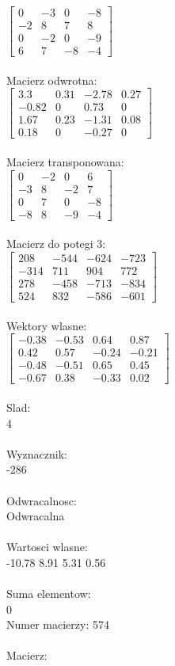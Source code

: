 \documentclass[a4paper,12pt]{article}
\begin{document}
$\begin{bmatrix} 0&-3&0&-8\\-2&8&7&8\\0&-2&0&-9\\6&7&-8&-4 \end{bmatrix}$
\\
\\
Macierz odwrotna:\\

$\begin{bmatrix} 3.3&0.31&-2.78&0.27\\-0.82&0&0.73&0\\1.67&0.23&-1.31&0.08\\0.18&0&-0.27&0 \end{bmatrix}$
\\
\\
Macierz transponowana:\\

$\begin{bmatrix} 0&-2&0&6\\-3&8&-2&7\\0&7&0&-8\\-8&8&-9&-4 \end{bmatrix}$
\\
\\
Macierz do potegi 3:\\

$\begin{bmatrix} 208&-544&-624&-723\\-314&711&904&772\\278&-458&-713&-834\\524&832&-586&-601 \end{bmatrix}$
\\
\\
Wektory wlasne:\\

$\begin{bmatrix} -0.38&-0.53&0.64&0.87\\0.42&0.57&-0.24&-0.21\\-0.48&-0.51&0.65&0.45\\-0.67&0.38&-0.33&0.02 \end{bmatrix}$
\\
\\
Slad:\\
4
\\
\\
Wyznacznik:\\
-286
\\
\\
Odwracalnosc:\\
Odwracalna
\\
\\
Wartosci wlasne:\\
-10.78 8.91 5.31 0.56
\\
\\
Suma elementow:\\
0
\\
\newpage
Numer macierzy:
574
\\
\\
Macierz:\\
\end{document}

